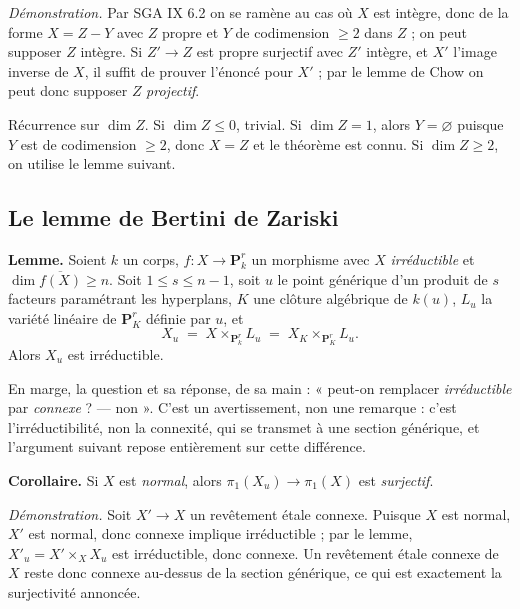 \documentclass[11pt,a4paper]{article}
\begin{document}
\emph{Démonstration.} Par SGA IX 6.2 on se ramène au cas où $X$ est intègre,
donc de la forme $X = Z - Y$ avec $Z$ propre et $Y$ de codimension $\geqslant 2$
dans $Z$ ; on peut supposer $Z$ intègre. Si $Z' \to Z$ est propre surjectif avec
$Z'$ intègre, et $X'$ l'image inverse de $X$, il suffit de prouver l'énoncé pour
$X'$ ; par le lemme de Chow on peut donc supposer $Z$ \emph{projectif}.

Récurrence sur $\dim Z$. Si $\dim Z \leqslant 0$, trivial. Si $\dim Z = 1$,
alors $Y = \varnothing$ puisque $Y$ est de codimension $\geqslant 2$, donc
$X = Z$ et le théorème est connu. Si $\dim Z \geqslant 2$, on utilise le lemme
suivant.

\subsection*{Le lemme de Bertini de Zariski}

\textbf{Lemme.} Soient $k$ un corps, $f : X \to \mathbf{P}^{r}_{k}$ un
morphisme avec $X$ \emph{irréductible} et $\dim \overline{f(X)} \geqslant n$.
Soit $1 \leqslant s \leqslant n-1$, soit $u$ le point générique d'un produit de
$s$ facteurs paramétrant les hyperplans, $K$ une clôture algébrique de $k(u)$,
$L_{u}$ la variété linéaire de $\mathbf{P}^{r}_{K}$ définie par $u$, et
\[
  X_{u} \;=\; X \times_{\mathbf{P}^{r}_{k}} L_{u}
        \;=\; X_{K} \times_{\mathbf{P}^{r}_{K}} L_{u} .
\]
Alors $X_{u}$ est irréductible.

En marge, la question et sa réponse, de sa main : « peut-on remplacer
\emph{irréductible} par \emph{connexe} ? --- non ». C'est un avertissement, non
une remarque : c'est l'irréductibilité, non la connexité, qui se transmet à une
section générique, et l'argument suivant repose entièrement sur cette
différence.

\textbf{Corollaire.} Si $X$ est \emph{normal}, alors
$\pi_{1}(X_{u}) \to \pi_{1}(X)$ est \emph{surjectif}.

\emph{Démonstration.} Soit $X' \to X$ un revêtement étale connexe. Puisque $X$
est normal, $X'$ est normal, donc connexe implique irréductible ; par le lemme,
$X'_{u} = X' \times_{X} X_{u}$ est irréductible, donc connexe. Un revêtement
étale connexe de $X$ reste donc connexe au-dessus de la section générique, ce
qui est exactement la surjectivité annoncée.

\end{document}
